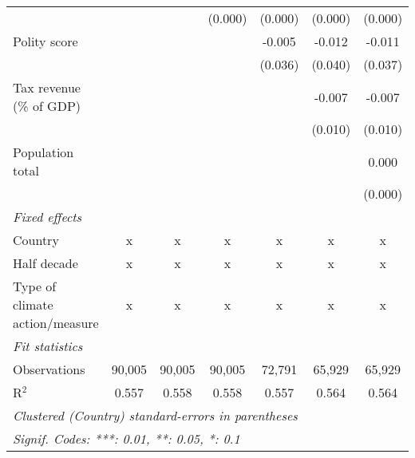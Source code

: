 \begin{tabular}{lcccccc}
                                                                                        &         &                & (0.000)        & (0.000)        & (0.000)        & (0.000)\\   
   Polity score                                                                         &         &                &                & -0.005         & -0.012         & -0.011\\   
                                                                                        &         &                &                & (0.036)        & (0.040)        & (0.037)\\   
   Tax revenue (\% of GDP)                                                              &         &                &                &                & -0.007         & -0.007\\   
                                                                                        &         &                &                &                & (0.010)        & (0.010)\\   
   Population total                                                                     &         &                &                &                &                & 0.000\\   
                                                                                        &         &                &                &                &                & (0.000)\\   
   \emph{Fixed effects}\\
   Country                                                                              & x       & x              & x              & x              & x              & x\\  
   Half decade                                                                          & x       & x              & x              & x              & x              & x\\  
   Type of climate action/measure                                                       & x       & x              & x              & x              & x              & x\\  
   \midrule \emph{Fit statistics}\\
   Observations                                                                         & 90,005  & 90,005         & 90,005         & 72,791         & 65,929         & 65,929\\  
   R$^2$                                                                                & 0.557   & 0.558          & 0.558          & 0.557          & 0.564          & 0.564\\  
   \midrule
   \multicolumn{7}{l}{\emph{Clustered (Country) standard-errors in parentheses}}\\
   \multicolumn{7}{l}{\emph{Signif. Codes: ***: 0.01, **: 0.05, *: 0.1}}\\
\end{tabular}
\par\endgroup


